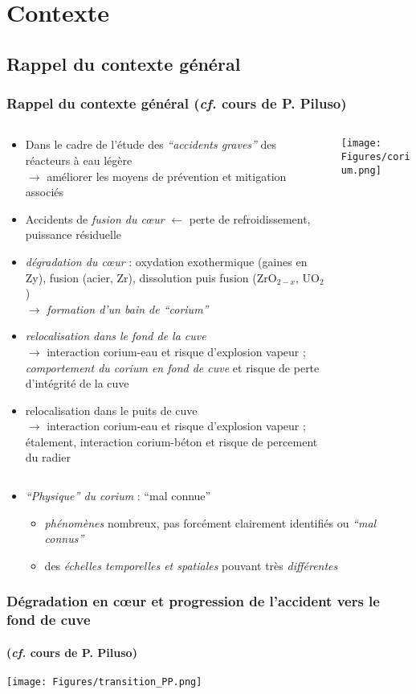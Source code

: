 
\section{Contexte}
\subsection{Rappel du contexte général}
\begin{frame}[fragile]
\frametitle{Rappel du contexte général (\textit{cf.} cours de P. Piluso)}
  \begin{columns}[T]
  \begin{column}{0.75\textwidth}
    \begin{itemize}
      \item Dans le cadre de l'étude des \emph{``accidents graves''} des réacteurs à eau légère \\ $\rightarrow$ améliorer les moyens de prévention et mitigation associés
      \item Accidents de \emph{fusion du c\oe ur} $\leftarrow$ perte de refroidissement, puissance résiduelle
      \item \emph{dégradation du c\oe ur} : oxydation exothermique (gaines en Zy), fusion (acier, Zr), dissolution puis fusion (ZrO$_{2-x}$, UO$_2$) \\ $\rightarrow$ \emph{formation d'un bain de ``corium''}
      \item \emph{relocalisation dans le fond de la cuve} \\ $\rightarrow$ interaction corium-eau et risque d'explosion vapeur ; \emph{comportement du corium en fond de cuve}  et risque de perte d'intégrité de la cuve
      \item relocalisation dans le puits de cuve \\ $\rightarrow$ interaction corium-eau  et risque d'explosion vapeur ; étalement, interaction corium-béton et risque de percement du radier
    \end{itemize}
  \end{column}
  \begin{column}{0.25\textwidth}
    \texttt{[image: Figures/corium.png]}
  \end{column}
  \end{columns}
\begin{itemize}
  \item \emph{``Physique'' du corium} : ``mal connue'' 
  \begin{itemize}
    \item \emph{phénomènes} nombreux, pas forcément clairement identifiés ou \emph{``mal connus''} 
    \item des \emph{échelles temporelles et spatiales} pouvant très \emph{différentes}
  \end{itemize}
\end{itemize}
\end{frame}
\begin{frame}[fragile]
\frametitle{Dégradation en c\oe ur et progression de l'accident vers le fond de cuve}
\framesubtitle{(\textit{cf.} cours de P. Piluso)}
\begin{center}
\texttt{[image: Figures/transition\_PP.png]}
\end{center}
\end{frame}
